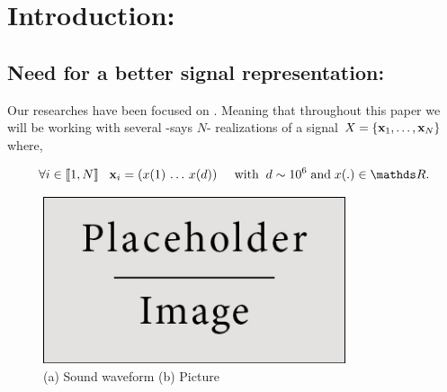 \documentclass[a4paper,11pt]{report}
\begin{document}
	\vfill	
		
	\newpage
	\thispagestyle{empty}
	\mbox{}
 
	\setcounter{tocdepth}{3}
	\renewcommand{\contentsname}{Contents:}
	\tableofcontents
	\clearpage

	\renewcommand{\listfigurename}{List of figures:}
	\listoffigures

\chapter{Introduction:}
	\label{chap:Intro}
		   
	\section{Need for a better signal representation:}
		\label{seq:Intro/Need}
		
		Our researches have been focused on . Meaning that throughout this paper we will be working with several -says $N$- realizations of a signal $X =\{{\bf x}_{1}, \dots  , {\bf x}_{N}\}$  where,
			
		\begin{equation*}
			\forall i \in \llbracket 1 , N \rrbracket \;\;\; \bfx_{i}=(x(1) \, \dots  \, x(d)) \;\;\;\;\; \text{with} \;\; d \sim 10^{6} \; \text{and} \; x(.) \in \dsR.  
		\end{equation*}
		
		\begin{figure}
			\begin{center}
				\includegraphics[width=3.5in]{placeholder.jpg}
			  \caption[High dimensional signals]{(a) Sound waveform (b) Picture}
			  \label{fig:highDim signals}
			\end{center}
		\end{figure}
		
\end{document}
